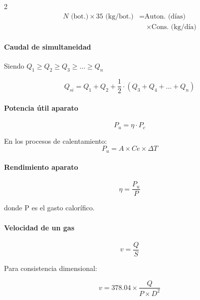 \documentclass[11pt]{article}
\begin{document}
\begin{multicols*}{2}
    \begin{align*}
        N \text{ (bot.)} \times 35 \text{ (kg/bot.)} &= \text{Auton. (días)} \\
        &\quad \times \text{Cons. (kg/día)} 
    \end{align*}

    \paragraph{Caudal de simultaneidad}

    Siendo $Q_1 \geq Q_2 \geq Q_3 \geq \dots \geq Q_n$

    \begin{equation*}
        Q_{si} = Q_1 + Q_2 + \frac{1}{2} \cdot \left(Q_3 + Q_4 + \dots + Q_n\right)
    \end{equation*}

    \paragraph{Potencia útil aparato}

    \begin{equation*}
        P_u = \eta \cdot P_c
    \end{equation*}

    En los procesos de calentamiento:
    \begin{equation*}
        P_u = A \times Ce \times \Delta T
    \end{equation*}

    \paragraph{Rendimiento aparato}

    \begin{equation*}
        \eta = \frac{P_u}{P}
    \end{equation*}

    donde P es el gasto calorífico.

    \paragraph{Velocidad de un gas}

    \begin{equation*}
        v = \frac{Q}{S}
    \end{equation*}

    Para consistencia dimensional:

    \begin{equation*}
        v = 378.04 \times \frac{Q}{P \times D^2}
    \end{equation*}


\end{multicols*}
\end{document}
